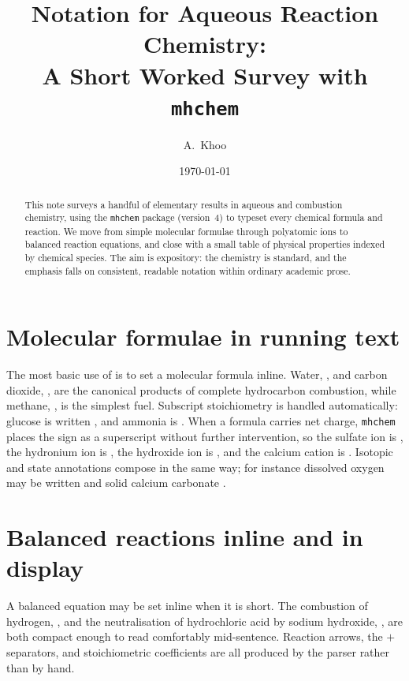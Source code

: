 \documentclass[11pt]{article}
\title{Notation for Aqueous Reaction Chemistry:\\ A Short Worked Survey with \texttt{mhchem}}
\author{A.\ Khoo}
\date{\today}
\begin{document}
\maketitle

\begin{abstract}
This note surveys a handful of elementary results in aqueous and combustion
chemistry, using the \texttt{mhchem} package (version~4) to typeset every
chemical formula and reaction. We move from simple molecular formulae through
polyatomic ions to balanced reaction equations, and close with a small table of
physical properties indexed by chemical species. The aim is expository: the
chemistry is standard, and the emphasis falls on consistent, readable notation
within ordinary academic prose.
\end{abstract}

\section{Molecular formulae in running text}

The most basic use of \ce{} is to set a molecular formula inline. Water,
, and carbon dioxide, , are the canonical products of complete
hydrocarbon combustion, while methane, , is the simplest fuel. Subscript
stoichiometry is handled automatically: glucose is written , and
ammonia is . When a formula carries net charge, \texttt{mhchem} places
the sign as a superscript without further intervention, so the sulfate ion is
, the hydronium ion is , the hydroxide ion is , and
the calcium cation is . Isotopic and state annotations compose in the
same way; for instance dissolved oxygen may be written  and solid
calcium carbonate .

\section{Balanced reactions inline and in display}

A balanced equation may be set inline when it is short. The combustion of
hydrogen, , and the neutralisation of hydrochloric acid by
sodium hydroxide, , are both compact enough to read
comfortably mid-sentence. Reaction arrows, the $+$ separators, and stoichiometric
coefficients are all produced by the \ce{} parser rather than by hand.
\end{document}
